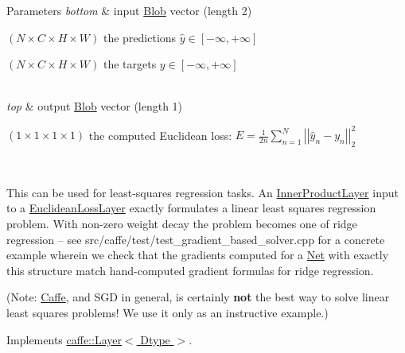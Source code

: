 \begin{DoxyParams}{Parameters}
{\em bottom} & input \hyperlink{classcaffe_1_1Blob}{Blob} vector (length 2)
\begin{DoxyEnumerate}
\item $ (N \times C \times H \times W) $ the predictions $ \hat{y} \in [-\infty, +\infty]$
\item $ (N \times C \times H \times W) $ the targets $ y \in [-\infty, +\infty]$ 
\end{DoxyEnumerate}\\
\hline
{\em top} & output \hyperlink{classcaffe_1_1Blob}{Blob} vector (length 1)
\begin{DoxyEnumerate}
\item $ (1 \times 1 \times 1 \times 1) $ the computed Euclidean loss\+: $ E = \frac{1}{2n} \sum\limits_{n=1}^N \left| \left| \hat{y}_n - y_n \right| \right|_2^2 $
\end{DoxyEnumerate}\\
\hline
\end{DoxyParams}
This can be used for least-\/squares regression tasks. An \hyperlink{classcaffe_1_1InnerProductLayer}{Inner\+Product\+Layer} input to a \hyperlink{classcaffe_1_1EuclideanLossLayer}{Euclidean\+Loss\+Layer} exactly formulates a linear least squares regression problem. With non-\/zero weight decay the problem becomes one of ridge regression -- see src/caffe/test/test\+\_\+gradient\+\_\+based\+\_\+solver.\+cpp for a concrete example wherein we check that the gradients computed for a \hyperlink{classcaffe_1_1Net}{Net} with exactly this structure match hand-\/computed gradient formulas for ridge regression.

(Note\+: \hyperlink{classcaffe_1_1Caffe}{Caffe}, and S\+GD in general, is certainly {\bfseries not} the best way to solve linear least squares problems! We use it only as an instructive example.) 

Implements \hyperlink{classcaffe_1_1Layer_add965883f75bbf90c7a06f960cda7a1a}{caffe\+::\+Layer$<$ Dtype $>$}.

